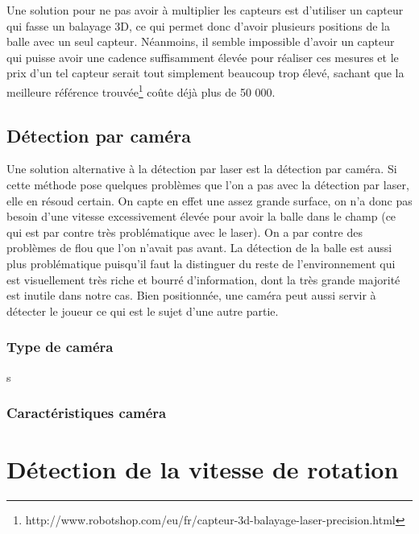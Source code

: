 Une solution pour ne pas avoir à multiplier les capteurs est d'utiliser un capteur qui fasse un balayage 3D, ce qui permet donc d'avoir plusieurs positions de la balle avec un seul capteur. Néanmoins, il semble impossible d'avoir un capteur qui puisse avoir une cadence suffisamment élevée pour réaliser ces mesures et le prix d'un tel capteur serait tout simplement beaucoup trop élevé, sachant que la meilleure référence trouvée\footnote{http://www.robotshop.com/eu/fr/capteur-3d-balayage-laser-precision.html} coûte déjà plus de 50 000\texteuro. 


\subsection{Détection par caméra}

Une solution alternative à la détection par laser est la détection par caméra. Si cette méthode pose quelques problèmes que l'on a pas avec la détection par laser, elle en résoud certain. On capte en effet une assez grande surface, on n'a donc pas besoin d'une vitesse excessivement élevée pour avoir la balle dans le champ (ce qui est par contre très problématique avec le laser). On a par contre des problèmes de flou que l'on n'avait pas avant. La détection de la balle est aussi plus problématique puisqu'il faut la distinguer du reste de l'environnement qui est visuellement très riche et bourré d'information, dont la très grande majorité est inutile dans notre cas. Bien positionnée, une caméra peut aussi servir à détecter le joueur ce qui est le sujet d'une autre partie.


\subsubsection{Type de caméra}

s

\subsubsection{Caractéristiques caméra}












\section{Détection de la vitesse de rotation}

